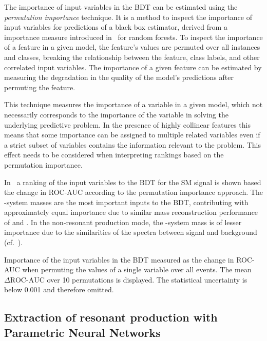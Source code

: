 The importance of input variables in the BDT can be estimated using
the \emph{permutation importance} technique. It is a method to inspect
the importance of input variables for predictions of a black box
estimator, derived from a importance measure introduced
in~\cite{breiman01} for random forests. To inspect the importance of a
feature in a given model, the feature's values are permuted over all
instances and classes, breaking the relationship between the feature,
class labels, and other correlated input variables. The importance of
a given feature can be estimated by measuring the degradation in the
quality of the model's predictions after permuting the feature.

This technique measures the importance of a variable in a given model,
which not necessarily corresponds to the importance of the variable in
solving the underlying predictive problem. In the presence of highly
collinear features this means that some importance can be assigned to
multiple related variables even if a strict subset of variables
contains the information relevant to the problem. This effect needs to
be considered when interpreting rankings based on the permutation
importance.

In~ a ranking of the input variables
to the BDT for the SM \HH signal is shown based the change in ROC-AUC
according to the permutation importance approach. The \PHiggs-system
masses are the most important inputs to the BDT, contributing with
approximately equal importance due to similar mass reconstruction
performance of \mMMC and \mBB. In the non-resonant production mode,
the \HH-system mass is of lesser importance due to the similarities of
the \mHH spectra between signal and background
(cf.~).

\begin{table}[htbp]
  \centering

  

  \caption{Importance of the input variables in the BDT measured as
    the change in ROC-AUC when permuting the values of a single
    variable over all events. The mean $\Delta\text{ROC-AUC}$ over 10
    permutations is displayed. The statistical uncertainty is below
    0.001 and therefore omitted.}
  \label{tab:variable_importance_bdt}
\end{table}


\subsection{Extraction of resonant \HH production with Parametric
  Neural Networks}
\label{sec:mva_pnn}

